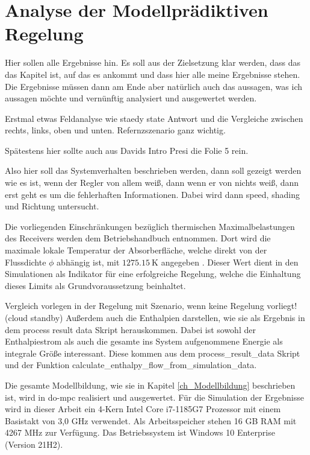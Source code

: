 \chapter{Analyse der Modellprädiktiven Regelung} \label{ch_AnalyseRegelung}
Hier sollen alle Ergebnisse hin.
Es soll aus der Zielsetzung klar werden, dass das das Kapitel ist, auf das es ankommt und dass hier alle meine Ergebnisse stehen.
Die Ergebnisse müssen dann am Ende aber natürlich auch das aussagen, was ich aussagen möchte und vernünftig analysiert und ausgewertet werden.

Erstmal etwas Feldanalyse wie staedy state Antwort und die Vergleiche zwischen rechts, links, oben und unten.
Refernzszenario ganz wichtig.

Spätestens hier sollte auch aus Davids Intro Presi die Folie 5 rein.

Also hier soll das Systemverhalten beschrieben werden, dann soll gezeigt werden wie es ist, wenn der Regler von allem weiß, dann wenn er von nichts weiß, dann erst geht es um die fehlerhaften Informationen.
Dabei wird dann speed, shading und Richtung untersucht.

Die vorliegenden Einschränkungen bezüglich thermischen Maximalbelastungen des Receivers werden dem Betriebshandbuch entnommen.
Dort wird die maximale lokale Temperatur der Absorberfläche, welche direkt von der Flussdichte $\phi$ abhängig ist, mit $\SI{1275.15}{\kelvin}$ angegeben \cite{HandbuchJülich}. Dieser Wert dient in den Simulationen als Indikator für eine erfolgreiche Regelung, welche die Einhaltung dieses Limits als Grundvoraussetzung beinhaltet.

Vergleich vorlegen in der Regelung mit Szenario, wenn keine Regelung vorliegt! (cloud standby)
Außerdem auch die Enthalpien darstellen, wie sie als Ergebnis in dem process result data Skript herauskommen.
Dabei ist sowohl der Enthalpiestrom als auch die gesamte ins System aufgenommene Energie als integrale Größe interessant.
Diese kommen aus dem process_result_data Skript und der Funktion calculate_enthalpy_flow_from_simulation_data.

Die gesamte Modellbildung, wie sie in Kapitel \ref{ch_Modellbildung} beschrieben ist, wird in do-mpc realisiert und ausgewertet.
Für die Simulation der Ergebnisse wird in dieser Arbeit ein 4-Kern Intel Core i7-1185G7 Prozessor mit einem Basistakt von 3,0 GHz verwendet.
Als Arbeitsspeicher stehen 16 GB RAM mit 4267 MHz zur Verfügung.
Das Betriebssystem ist Windows 10 Enterprise (Version 21H2).

